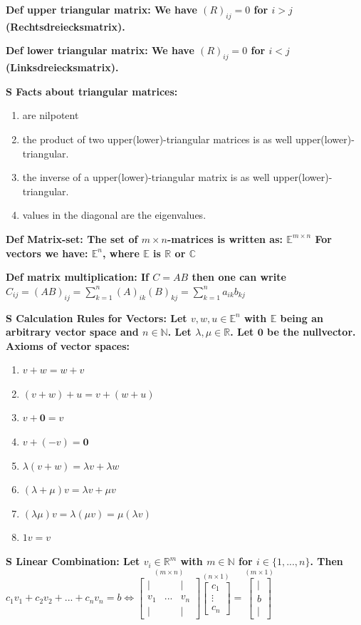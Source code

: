 \documentclass[7pt,landscape, margin = 0.1mm]{article}
\newcommand{\DEF}[2]{\color{chaptercolor}\bf{Def #1}:\color{black}    \hspace{0.2cm} #2}
\newcommand{\SA}[2]{\color{chaptercolor}\bf{S #1}:\color{black}    \hspace{0.2cm} #2}
\begin{document}
\begin{multicols}{4}
\begin{flushleft}
{\DEF{upper triangular matrix}{We have $(R)_{ij} = 0$ for $i > j $ (Rechtsdreiecksmatrix).}

\DEF{lower triangular matrix}{We have $(R)_{ij} = 0$ for $i < j $ (Linksdreiecksmatrix).}

\SA{Facts about triangular matrices}{\begin{enumerate}[nolistsep]
    \item are nilpotent
    \item the product of two upper(lower)-triangular matrices is as well upper(lower)-triangular.
    \item the inverse of a upper(lower)-triangular matrix is as well upper(lower)-triangular.
    \item values in the diagonal are the eigenvalues.
\end{enumerate}}

\DEF{Matrix-set}{The set of $ m \times n $-matrices is written as: $\mathbb{E}^{m \times n } $ For vectors we have: $ \mathbb{E}^{n}$, where $ \mathbb{E}$ is $ \mathbb{R}$ or $ \mathbb{C}$}

\DEF{matrix multiplication}{If $C =AB $ then one can write $C_{ij} = (AB)_{ij} = \sum_{k=1}^{n} (A)_{ik}(B)_{kj} = \sum_{k=1}^{n} a_{ik}b_{kj}$}

\SA{Calculation Rules for Vectors}{
Let $v,w,u \in \mathbb{E}^n$ with $\mathbb{E}$ being an arbitrary vector space and $n \in \mathbb{N}$. Let $\lambda,\mu \in \mathbb{R}$. Let $\bm{0}$ be the nullvector. Axioms of vector spaces:
\begin{enumerate}[nolistsep]
 \item $v+w=w+v$
 \item $(v+w)+u= v+(w+u)$
 \item $v+\bm{0}=v$
 \item $v+(-v)=\bm{0}$
 \item $\lambda (v+w)= \lambda v + \lambda w$
 \item $(\lambda + \mu)v= \lambda v + \mu v $
 \item $(\lambda \mu)v= \lambda (\mu v) = \mu (\lambda v)$
 \item $1v=v$
\end{enumerate}}

\SA{Linear Combination}{Let $v_i \in \mathbb{R}^m$ with $m \in \mathbb{N}$ for $i \in \{1, ..., n\}$. Then
$c_1v_1 + c_2v_2 + ... + c_n v_n = b \iff \stackrel{(m \times n)}{\begin{bmatrix}
| &  & |\\
v_1 & ... & v_n\\
| &  & |
\end{bmatrix}} \stackrel{(n \times 1)}{\begin{bmatrix}
c_1\\ \vdots\\ c_n
\end{bmatrix}} = \stackrel{(m \times 1)}{\begin{bmatrix}
|\\ b\\ |
\end{bmatrix}
}$}

}
\end{flushleft}
\end{multicols}
\end{document}
